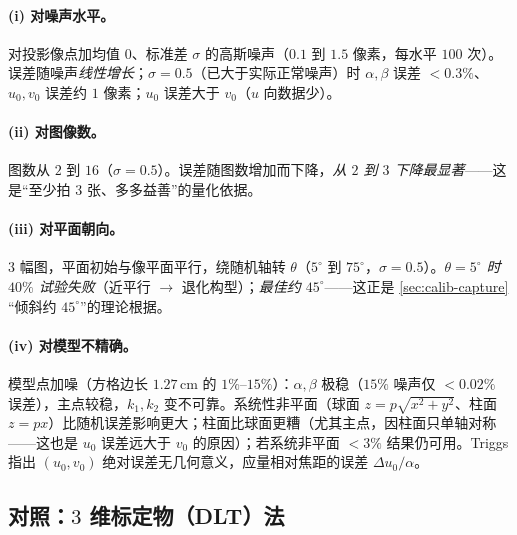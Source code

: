 \paragraph{(i) 对噪声水平。}
对投影像点加均值 $0$、标准差 $\sigma$ 的高斯噪声（$0.1$ 到 $1.5$ 像素，每水平 $100$ 次）。误差随噪声\emph{线性增长}；$\sigma=0.5$（已大于实际正常噪声）时 $\alpha,\beta$ 误差 $<0.3\%$、$u_0,v_0$ 误差约 $1$ 像素；$u_0$ 误差大于 $v_0$（$u$ 向数据少）。

\paragraph{(ii) 对图像数。}
图数从 $2$ 到 $16$（$\sigma=0.5$）。误差随图数增加而下降，\emph{从 $2$ 到 $3$ 下降最显著}——这是“至少拍 $3$ 张、多多益善”的量化依据。

\paragraph{(iii) 对平面朝向。}
$3$ 幅图，平面初始与像平面平行，绕随机轴转 $\theta$（$5^\circ$ 到 $75^\circ$，$\sigma=0.5$）。\emph{$\theta=5^\circ$ 时 $40\%$ 试验失败}（近平行 $\to$ 退化构型）；\emph{最佳约 $45^\circ$}——这正是 \cref{sec:calib-capture} “倾斜约 $45^\circ$”的理论根据。

\paragraph{(iv) 对模型不精确。}
模型点加噪（方格边长 $1.27\,\mathrm{cm}$ 的 $1\%$--$15\%$）：$\alpha,\beta$ 极稳（$15\%$ 噪声仅 $<0.02\%$ 误差），主点较稳，$k_1,k_2$ 变不可靠。系统性非平面（球面 $z=p\sqrt{x^2+y^2}$、柱面 $z=px$）比随机误差影响更大；柱面比球面更糟（尤其主点，因柱面只单轴对称——这也是 $u_0$ 误差远大于 $v_0$ 的原因）；若系统非平面 $<3\%$ 结果仍可用。Triggs\cite{triggs1998autocalib} 指出 $(u_0,v_0)$ 绝对误差无几何意义，应量相对焦距的误差 $\Delta u_0/\alpha$。

\subsection{对照：$3$ 维标定物（DLT）法}

